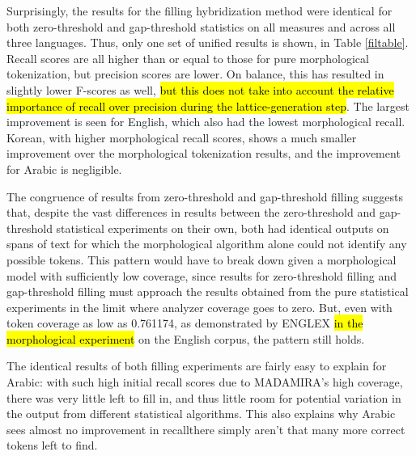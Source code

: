 
Surprisingly, the results for the filling hybridization method were identical for both zero-threshold and gap-threshold statistics on all measures and across all three languages. Thus, only one set of unified results is shown, in Table \ref{filtable}. Recall scores are all higher than or equal to those for pure morphological tokenization, but precision scores are lower. On balance, this has resulted in slightly lower F-scores as well, \hl{but this does not take into account the relative importance of recall over precision during the lattice-generation step}. The largest improvement is seen for English, which also had the lowest morphological recall. Korean, with higher morphological recall scores, shows a much smaller improvement over the morphological tokenization results, and the improvement for Arabic is negligible.

The congruence of results from zero-threshold and gap-threshold filling suggests that, despite the vast differences in results between the zero-threshold and gap-threshold statistical experiments on their own, both had identical outputs on spans of text for which the morphological algorithm alone could not identify any possible tokens. This pattern would have to break down given a morphological model with sufficiently low coverage, since results for zero-threshold filling and gap-threshold filling must approach the results obtained from the pure statistical experiments in the limit where analyzer coverage goes to zero. But, even with token coverage as low as 0.761174, as demonstrated by ENGLEX \hl{in the morphological experiment} on the English corpus, the pattern still holds.

The identical results of both filling experiments are fairly easy to explain for Arabic: with such high initial recall scores due to MADAMIRA's high coverage, there was very little left to fill in, and thus little room for potential variation in the output from different statistical algorithms. This also explains why Arabic sees almost no improvement in recall\textemdash there simply aren't that many more correct tokens left to find. 

